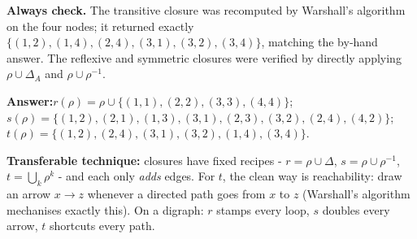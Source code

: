 \documentclass[11pt,a4paper]{article}
\newcommand{\answer}[1]{\begin{answerbox}\centering\textbf{Answer:}\quad #1\end{answerbox}}
\begin{document}
\begin{center}
\end{center}

\textbf{Always check.} The transitive closure was recomputed by Warshall's algorithm on the four
nodes; it returned exactly $\{(1,2),(1,4),(2,4),(3,1),(3,2),(3,4)\}$, matching the by-hand answer.
The reflexive and symmetric closures were verified by directly applying $\rho\cup\Delta_A$ and
$\rho\cup\rho^{-1}$. \checkmark

\answer{$r(\rho)=\rho\cup\{(1,1),(2,2),(3,3),(4,4)\}$;\quad
$s(\rho)=\{(1,2),(2,1),(1,3),(3,1),(2,3),(3,2),(2,4),(4,2)\}$;\quad
$t(\rho)=\{(1,2),(2,4),(3,1),(3,2),(1,4),(3,4)\}$.}

\begin{methodbox}
\textbf{Transferable technique:} closures have fixed recipes - $r=\rho\cup\Delta$,
$s=\rho\cup\rho^{-1}$, $t=\bigcup_k\rho^k$ - and each only \emph{adds} edges. For $t$, the clean way
is reachability: draw an arrow $x\to z$ whenever a directed path goes from $x$ to $z$ (Warshall's
algorithm mechanises exactly this). On a digraph: $r$ stamps every loop, $s$ doubles every arrow,
$t$ shortcuts every path.
\end{methodbox}
\end{document}

